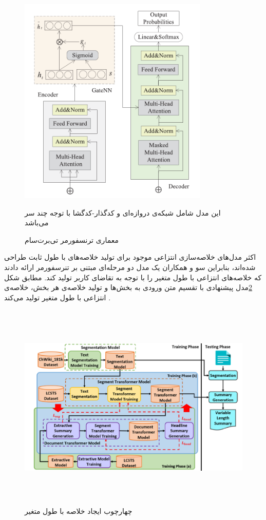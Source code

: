 \begin{figure}[!h]
	\begin{center}
		\includegraphics[height=10cm]{tbertsum_transformer.png}
	\end{center}
	\caption{ معماری ترنسفورمر تی‌برت‌سام \cite{Ma2022TBERTSumTT}}
	\label{fig:tBert_transformer}
	\medskip
	\small
	\centerline{	این مدل شامل شبکه‌ی دروازه‌ای و کدگذار-کدگشا با توجه چند سر می‌باشد\cite{Ma2022TBERTSumTT}}
	
\end{figure}

اکثر مدل‌های خلاصه‌سازی انتزاعی موجود برای تولید خلاصه‌های با طول ثابت طراحی شده‌اند، بنابراین سو
و همکاران یک مدل دو مرحله‌ای مبتنی بر تنرسفورمر ارائه دادند که خلاصه‌های انتزاعی با طول متغیر را با توجه به تقاضای کاربر تولید کند. مطابق شکل  \ref{fig:two_stage_model}مدل پیشنهادی با تقسیم متن ورودی به بخش‌ها و تولید خلاصه‌ی هر بخش، خلاصه‌ی انتزاعی با طول متغیر تولید می‌کند
\cite{twostage}.
\begin{figure}[!h]
	\begin{center}
		\includegraphics[height=10cm]{two-stage model.png}
	\end{center}
	\caption{ چهارچوب ایجاد خلاصه با طول متغیر\cite{twostage}}
	\label{fig:two_stage_model}
	\medskip
	\small	
\end{figure}

